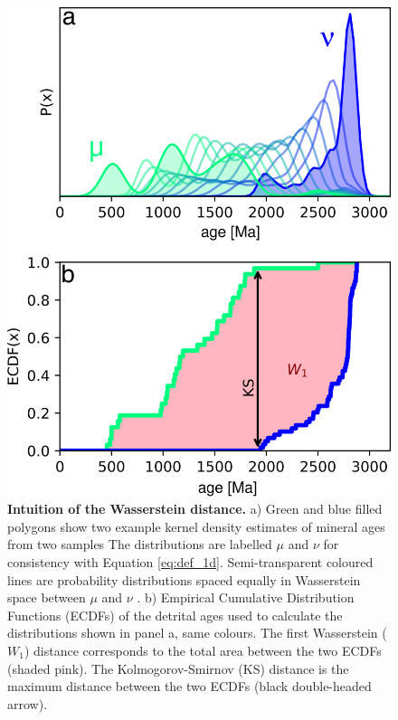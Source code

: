 \documentclass[gchron, manuscript]{article}
\begin{document}
\begin{figure}
    \centering
    \includegraphics{figures/fig01.png}
    \caption{\textbf{Intuition of the Wasserstein distance.} a) Green and blue filled polygons show two example kernel density estimates of mineral ages from two samples \citep[based on data from][]{morton_provenance_2008} The distributions are labelled $\mu$ and $\nu$ for consistency with Equation \ref{eq:def_1d}. Semi-transparent coloured lines are probability distributions spaced equally in Wasserstein space between $\mu$ and $\nu$ \citep[termed `barycentres'][]{benamou_iterative_2015}. b) Empirical Cumulative Distribution Functions (ECDFs) of the detrital ages used to calculate the distributions shown in panel a, same colours. The first Wasserstein ($W_1$) distance corresponds to the total area between the two ECDFs (shaded pink). The Kolmogorov-Smirnov (KS) distance is the maximum distance between the two ECDFs (black double-headed arrow).}
    \label{fig:intro}
\end{figure}
\end{document}
